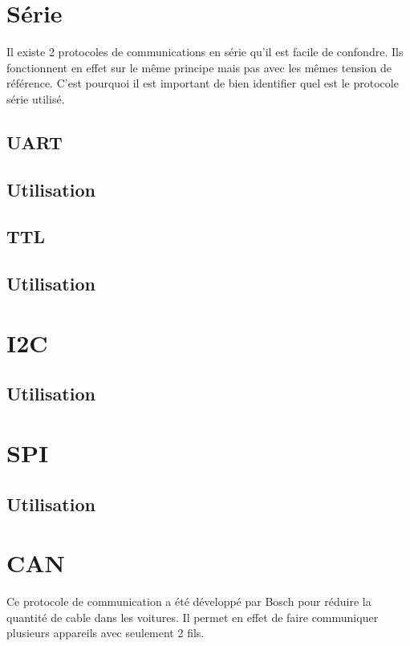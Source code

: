 \documentclass[a4paper, 11pt]{report}
\begin{document}
\section{Série}
Il existe 2 protocoles de communications en série qu'il est facile de confondre. Ils fonctionnent en effet sur le même principe mais pas avec les mêmes tension de référence. C'est pourquoi il est important de bien identifier quel est le protocole série utilisé.

\subsection{UART}

\subsection{Utilisation}

\subsection{TTL}

\subsection{Utilisation}

\section{I2C}

\subsection{Utilisation}

\section{SPI}

\subsection{Utilisation}

\section{CAN}
Ce protocole de communication a été développé par Bosch pour réduire la quantité de cable dans les voitures. Il permet en effet de faire communiquer plusieurs appareils avec seulement 2 fils.
\end{document}
